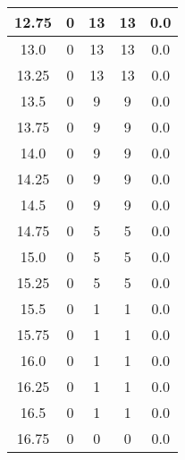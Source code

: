 \documentclass[letterpaper, 12pt]{article}
\begin{document}
\begin{longtable}{|c|c|c|c|c|}
\hline
12.75 & 0 & 13 & 13 & 0.0 \\
\hline
13.0 & 0 & 13 & 13 & 0.0 \\
\hline
13.25 & 0 & 13 & 13 & 0.0 \\
\hline
13.5 & 0 & 9 & 9 & 0.0 \\
\hline
13.75 & 0 & 9 & 9 & 0.0 \\
\hline
14.0 & 0 & 9 & 9 & 0.0 \\
\hline
14.25 & 0 & 9 & 9 & 0.0 \\
\hline
14.5 & 0 & 9 & 9 & 0.0 \\
\hline
14.75 & 0 & 5 & 5 & 0.0 \\
\hline
15.0 & 0 & 5 & 5 & 0.0 \\
\hline
15.25 & 0 & 5 & 5 & 0.0 \\
\hline
15.5 & 0 & 1 & 1 & 0.0 \\
\hline
15.75 & 0 & 1 & 1 & 0.0 \\
\hline
16.0 & 0 & 1 & 1 & 0.0 \\
\hline
16.25 & 0 & 1 & 1 & 0.0 \\
\hline
16.5 & 0 & 1 & 1 & 0.0 \\
\hline
16.75 & 0 & 0 & 0 & 0.0 \\
\hline
\end{longtable}
\end{document}
